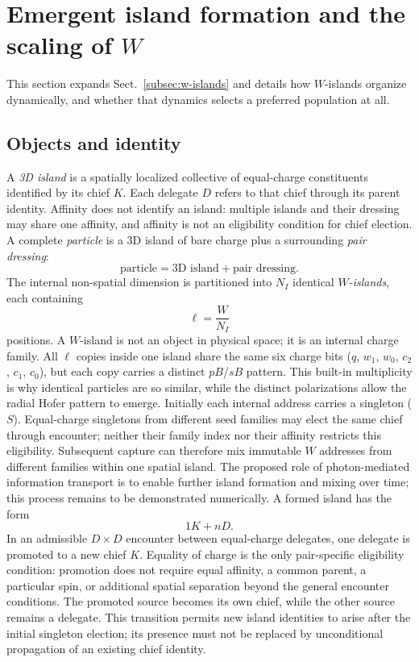\documentclass[a4paper]{article}
\begin{document}
\section{Emergent island formation and the scaling of $W$}\label{sec:dynamic-charge-quantization}
This section expands Sect.~\ref{subsec:w-islands} and details how $W$-islands organize dynamically, and whether that dynamics selects a preferred population at all.
\subsection{Objects and identity}
A \emph{3D island} is a spatially localized collective of equal-charge constituents identified by its chief $K$. Each delegate $D$ refers to that chief through its parent identity. Affinity does not identify an island: multiple islands and their dressing may share one affinity, and affinity is not an eligibility condition for chief election. A complete \emph{particle} is a 3D island of bare charge plus a surrounding \emph{pair dressing}:
\begin{equation}
\text{particle} = \text{3D island} + \text{pair dressing}.
\end{equation}
The internal non-spatial dimension is partitioned into $N_I$ identical \emph{$W$-islands}, each containing
\begin{equation}
\ell = \frac{W}{N_I}
\end{equation}
positions. A $W$-island is not an object in physical space; it is an internal charge family. All $\ell$ copies inside one island share the same six charge bits ($q$, $w_1$, $w_0$, $c_2$, $c_1$, $c_0$), but each copy carries a distinct $pB$/$sB$ pattern. This built-in multiplicity is why identical particles are so similar, while the distinct polarizations allow the radial Hofer pattern to emerge.
Initially each internal address carries a singleton ($S$). Equal-charge singletons from different seed families may elect the same chief through encounter; neither their family index nor their affinity restricts this eligibility. Subsequent capture can therefore mix immutable $W$ addresses from different families within one spatial island. The proposed role of photon-mediated information transport is to enable further island formation and mixing over time; this process remains to be demonstrated numerically. A formed island has the form
\begin{equation}
1K + nD.
\end{equation}
In an admissible $D\times D$ encounter between equal-charge delegates, one delegate is promoted to a new chief $K$. Equality of charge is the only pair-specific eligibility condition: promotion does not require equal affinity, a common parent, a particular spin, or additional spatial separation beyond the general encounter conditions. The promoted source becomes its own chief, while the other source remains a delegate. This transition permits new island identities to arise after the initial singleton election; its presence must not be replaced by unconditional propagation of an existing chief identity.
\end{document}

